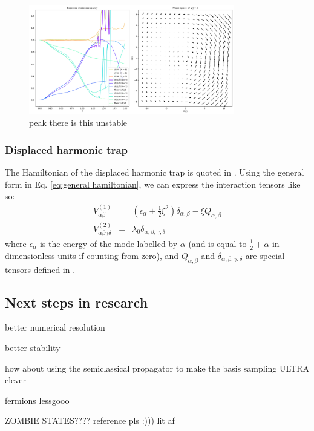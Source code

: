 \documentclass[12pt]{article}
\begin{document}
	\begin{figure}
	\begin{center}
	\includegraphics[width=0.8\textwidth]{images/BH_M=2_uncoupled_basis}
	\caption{peak there is this unstable}\label{fig:BH_M=2_uncoupled}
	\end{center}
	\end{figure}
	
	
	\subsubsection{Displaced harmonic trap}
	The Hamiltonian of the displaced harmonic trap is quoted in \cite[Eq. 34]{green}. Using the general form in Eq. \ref{eq:general hamiltonian}, we can express the interaction tensors like so:
	\begin{eqnarray}
	V^{(1)}_{\alpha\beta}&=&\left(\epsilon_{\alpha}+\frac{1}{2}\xi^2\right)\delta_{\alpha,\beta}-\xi Q_{\alpha,\beta}\\
	V^{(2)}_{\alpha\beta\gamma\delta}&=&\lambda_0\delta_{\alpha,\beta,\gamma,\delta}
	\end{eqnarray}
	where $\epsilon_{\alpha}$ is the energy of the mode labelled by $\alpha$ (and is equal to $\frac{1}{2}+\alpha$ in dimensionless units if counting from zero), and $Q_{\alpha,\beta}$ and $\delta_{\alpha,\beta,\gamma,\delta}$ are special tensors defined in \cite[Appendix B]{green}.
	
	
	
	\subsection{Next steps in research}
	better numerical resolution
	
	better stability
	
	how about using the semiclassical propagator to make the basis sampling ULTRA clever
	
	fermions lessgooo
	
	ZOMBIE STATES???? reference pls :))) lit af
	
\end{document}
